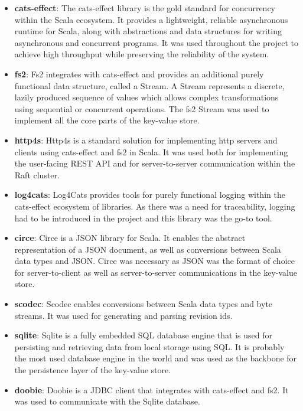 \begin{itemize}
    \item \textbf{cats-effect}: The cats-effect library is the gold standard for concurrency within the Scala ecosystem. It provides a lightweight, reliable asynchronous runtime for Scala, along with abstractions and data structures for writing asynchronous and concurrent programs. It was used throughout the project to achieve high throughput while preserving the reliability of the system.
    \item \textbf{fs2}: Fs2 integrates with cats-effect and provides an additional purely functional data structure, called a Stream. A Stream represents a discrete, lazily produced sequence of values which allows complex transformations using sequential or concurrent operations. The fs2 Stream was used to implement all the core parts of the key-value store. 
    \item \textbf{http4s}: Http4s is a standard solution for implementing http servers and clients using cats-effect and fs2 in Scala. It was used both for implementing the user-facing REST API and for server-to-server communication within the Raft cluster.
    \item \textbf{log4cats}: Log4Cats provides tools for purely functional logging within the cats-effect ecosystem of libraries. As there was a need for traceability, logging had to be introduced in the project and this library was the go-to tool.
    \item \textbf{circe}: Circe is a JSON library for Scala. It enables the abstract representation of a JSON document, as well as conversions between Scala data types and JSON. Circe was necessary as JSON was the format of choice for server-to-client as well as server-to-server communications in the key-value store.
    \item \textbf{scodec}: Scodec enables conversions between Scala data types and byte streams. It was used for generating and parsing revision ids.
    \item \textbf{sqlite}: Sqlite is a fully embedded SQL database engine that is used for persisting and retrieving data from local storage using SQL. It is probably the most used database engine in the world \cite{sqlite-most-used} and was used as the backbone for the persistence layer of the key-value store.
    \item \textbf{doobie}: Doobie is a JDBC client that integrates with cats-effect and fs2. It was used to communicate with the Sqlite database.
\end{itemize}

